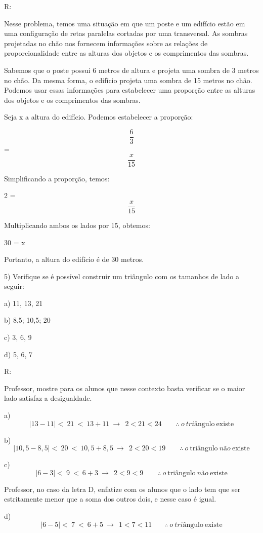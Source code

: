 R:

Nesse problema, temos uma situação em que um poste e um edifício estão
em uma configuração de retas paralelas cortadas por uma transversal. As
sombras projetadas no chão nos fornecem informações sobre as relações de
proporcionalidade entre as alturas dos objetos e os comprimentos das
sombras.

Sabemos que o poste possui 6 metros de altura e projeta uma sombra de 3
metros no chão. Da mesma forma, o edifício projeta uma sombra de 15
metros no chão. Podemos usar essas informações para estabelecer uma
proporção entre as alturas dos objetos e os comprimentos das sombras.

Seja x a altura do edifício. Podemos estabelecer a proporção:

\[\frac {6}{3}\] = \[\frac {x}{15}\]

Simplificando a proporção, temos:

2 = \[\frac {x}{15}\]

Multiplicando ambos os lados por 15, obtemos:

30 = x

Portanto, a altura do edifício é de 30 metros.

5) Verifique se é possível construir um triângulo com os tamanhos de
lado a seguir:

a) 11, 13, 21

b) 8,5; 10,5; 20

c) 3, 6, 9

d) 5, 6, 7

R:

Professor, mostre para os alunos que nesse contexto basta verificar se o
maior lado satisfaz a desigualdade.

a)
\[\left| 13 - 11 \right| < \ 21\  < \ 13 + 11\  \rightarrow \ \ 2 < 21 < 24\ \ \ \ \ \ \ \ \ \therefore\ o\ triâ\text{ngulo}\ \text{existe}\]

b)
\[\left| 10,5 - 8,5 \right| < \ 20\  < \ 10,5 + 8,5\  \rightarrow \ \ 2 < 20 < 19\ \ \ \ \ \ \ \ \ \therefore\ o\ \text{tri}â\text{ngulo}\ não\ \text{existe}\]

c)
\[\left| 6 - 3 \right| < \ 9\  < \ 6 + 3\  \rightarrow \ \ 2 < 9 < 9\ \ \ \ \ \ \ \ \ \therefore\ o\ \text{tri}â\text{ngulo}\ não\ \text{existe}\]

Professor, no caso da letra D, enfatize com os alunos que o lado tem que
ser estritamente menor que a soma dos outros dois, e nesse caso é igual.

d)
\[\left| 6 - 5 \right| < \ 7\  < \ 6 + 5\  \rightarrow \ \ 1 < 7 < 11\ \ \ \ \ \ \ \ \therefore\ o\ triâ\text{ngulo}\ \text{existe}\]

